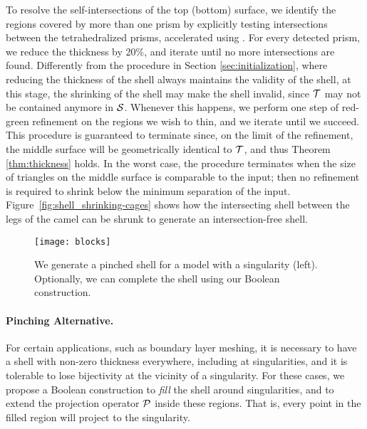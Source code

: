 To resolve the self-intersections of the top (bottom) surface, we identify the regions covered by more than one prism by explicitly testing intersections between the tetrahedralized prisms, accelerated using \cite{zomorodian2000fast}. For every detected prism, we reduce the thickness by 20\%, and iterate until no more intersections are found. 
Differently from the procedure in Section \ref{sec:initialization}, where reducing the thickness of the shell always maintains the validity of the shell, at this stage, the shrinking of the shell may make the shell invalid, since $\T$ may not be contained anymore in $\S$. 
Whenever this happens, we perform one step of red-green refinement \cite{bank1983some} on the regions we wish to thin, and we iterate until we succeed. This procedure is guaranteed to terminate since, on the limit of the refinement, the middle surface will be geometrically identical to $\T$, and thus Theorem \ref{thm:thickness} holds.
In the worst case, the procedure terminates when the size of triangles on the middle surface is comparable to the input; then no refinement is required to shrink below the minimum separation of the input.
Figure~\ref{fig:shell_shrinking-cages} shows how the intersecting shell between the legs of the camel can be shrunk to generate an intersection-free shell. 



\begin{figure}
    \centering
    \texttt{[image: blocks]}
    \caption{We generate a pinched shell for a model with a singularity (left).
    Optionally, we can complete the shell using our Boolean construction.}
    \label{fig:singularity-boolean}
    
\end{figure}


\paragraph{Pinching Alternative.} For certain applications, such as boundary layer meshing, it is necessary to have a shell with non-zero thickness everywhere, including at singularities, and it is tolerable to lose bijectivity at the vicinity of a singularity. For these cases, we propose a Boolean construction to \emph{fill} the shell around singularities, and to extend the projection operator $\P$ inside these regions. That is, every point in the filled region will project to the singularity. 

